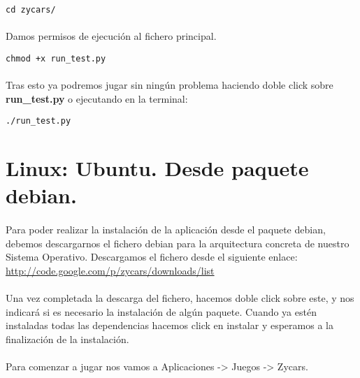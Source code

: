 \begin{lstlisting}[style=consola, numbers=none]
cd zycars/
\end{lstlisting}

\paragraph{}
Damos permisos de ejecución al fichero principal.

\begin{lstlisting}[style=consola, numbers=none]
chmod +x run_test.py
\end{lstlisting}

\paragraph{}
Tras esto ya podremos jugar sin ningún problema haciendo doble click sobre \textbf{run\_test.py} o ejecutando en la terminal:
\begin{lstlisting}[style=consola, numbers=none]
./run_test.py
\end{lstlisting}


\section{Linux: Ubuntu. Desde paquete debian.}

\paragraph{}
Para poder realizar la instalación de la aplicación desde el paquete debian, debemos descargarnos el fichero debian para
la arquitectura concreta de nuestro Sistema Operativo. Descargamos el fichero desde el siguiente enlace:\\

\url{http://code.google.com/p/zycars/downloads/list}

\paragraph{}
Una vez completada la descarga del fichero, hacemos doble click sobre este, y nos indicará si es necesario la instalación 
de algún paquete. Cuando ya estén instaladas todas las dependencias hacemos click en instalar y esperamos a la finalización
de la instalación.

\paragraph{}
Para comenzar a jugar nos vamos a Aplicaciones -> Juegos -> Zycars.


